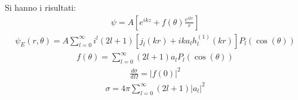 Si hanno i risultati:
\begin{equation}\begin{split}
\psi =A\left[e^{ikz}+f\left(\theta\right)\frac{e^{ikr}}{r}\right]
\end{split}\end{equation}
\begin{equation}\begin{split}
\psi _E\left(r,\theta\right)=A\sum_{l=0}^{\infty }{i^l\left(2l+1\right)\left[j_l\left(kr\right)+ika_lh^{\left(1\right)}_l\left(kr\right)\right]P_l\left(\cos{\left(\theta\right)}\right)}
\end{split}\end{equation}
\begin{equation}\begin{split}
f\left(\theta\right)=\sum_{l=0}^{\infty }{\left(2l+1\right)a_lP_l\left(\cos{\left(\theta\right)}\right)}
\end{split}\end{equation}
\begin{equation}\begin{split}
\frac{d\sigma}{d\Omega}=\left|f\left(0\right)\right|^2
\end{split}\end{equation}
\begin{equation}\begin{split}
\sigma=4\pi \sum_{l=0}^{\infty }{\left(2l+1\right)\left|a_l\right|^2}
\end{split}\end{equation}

